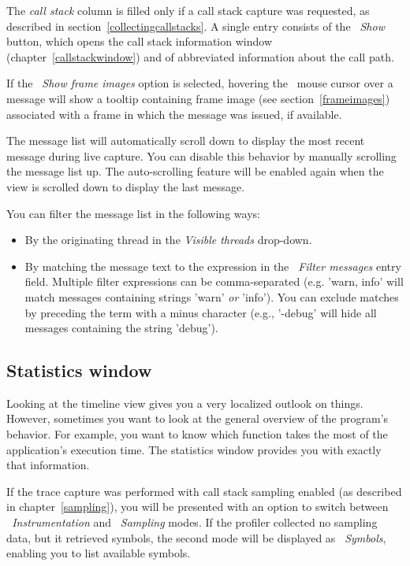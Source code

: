 \documentclass[hidelinks,titlepage,a4paper,twoside]{article}
\begin{document}
The \emph{call stack} column is filled only if a call stack capture was requested, as described in section~\ref{collectingcallstacks}. A single entry consists of the \emph{\faAlignJustify{}~Show} button, which opens the call stack information window (chapter~\ref{callstackwindow}) and of abbreviated information about the call path.

If the \emph{\faImage{}~Show frame images} option is selected, hovering the \faMousePointer{}~mouse cursor over a message will show a tooltip containing frame image (see section~\ref{frameimages}) associated with a frame in which the message was issued, if available.

The message list will automatically scroll down to display the most recent message during live capture. You can disable this behavior by manually scrolling the message list up. The auto-scrolling feature will be enabled again when the view is scrolled down to display the last message.

You can filter the message list in the following ways:

\begin{itemize}
\item By the originating thread in the \emph{\faRandom{} Visible threads} drop-down.
\item By matching the message text to the expression in the \emph{\faFilter{}~Filter messages} entry field. Multiple filter expressions can be comma-separated (e.g. 'warn, info' will match messages containing strings 'warn' \emph{or} 'info'). You can exclude matches by preceding the term with a minus character (e.g., '-debug' will hide all messages containing the string 'debug').
\end{itemize}

\subsection{Statistics window}
\label{statistics}

Looking at the timeline view gives you a very localized outlook on things. However, sometimes you want to look at the general overview of the program's behavior. For example, you want to know which function takes the most of the application's execution time. The statistics window provides you with exactly that information.

If the trace capture was performed with call stack sampling enabled (as described in chapter~\ref{sampling}), you will be presented with an option to switch between \emph{\faSyringe{}~Instrumentation} and \emph{\faEyeDropper{}~Sampling} modes. If the profiler collected no sampling data, but it retrieved symbols, the second mode will be displayed as \emph{\faPuzzlePiece{}~Symbols}, enabling you to list available symbols.
\end{document}
